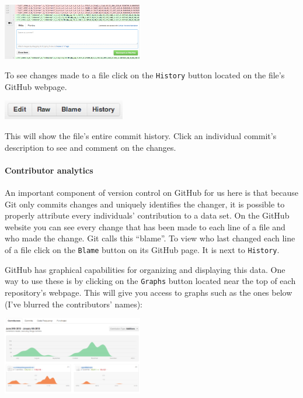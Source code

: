\documentclass[twocolumn]{article}\usepackage{graphicx, color}
\begin{document}
\begin{center}
	\includegraphics[width=0.46\textwidth]{images/BrowseChanges.png}
\end{center}

\noindent To see changes made to a file click on the \texttt{History} button located on the file's GitHub webpage.

\begin{center}
	\includegraphics[width=0.4\textwidth]{images/Raw.png}
\end{center}

\noindent This will show the file's entire commit history. Click an individual commit's description to see and comment on the changes.

\paragraph{Contributor analytics}

An important component of version control on GitHub for us here is that because Git only commits changes and uniquely identifies the changer, it is possible to properly attribute every individuals' contribution to a data set. On the GitHub website you can see every change that has been made to each line of a file and who made the change. Git calls this ``blame''. To view who last changed each line of a file click on the \texttt{Blame} button on its GitHub page. It is next to \texttt{History}.

GitHub has graphical capabilities for organizing and displaying this data. One way to use these is by clicking on the \texttt{Graphs} button located near the top of each repository's webpage. This will give you access to graphs such as the ones below (I've blurred the contributors' names):

\begin{center}
	\includegraphics[width=0.46\textwidth]{images/CommitHistory.png}
\end{center}
\end{document}
